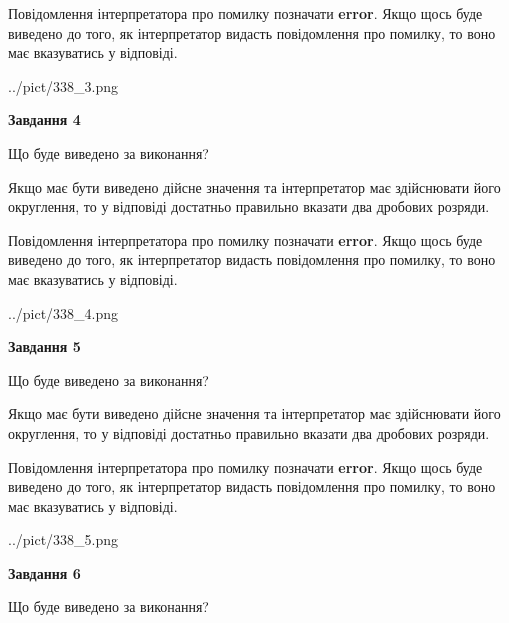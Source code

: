 \documentclass[12pt, ukrainian]{article}
\begin{document}
{\begin {Large}
Повідомлення інтерпретатора про помилку позначати \textbf{error}.
Якщо щось буде виведено до того, як інтерпретатор видасть повідомлення про помилку, 
то воно має вказуватись у відповіді. \par

\begin{center}
	{../pict/338_3.png}
\end{center}
\newpage

{\begin {center}\textbf{Завдання 4}\end {center}}\par
Що буде виведено за виконання? \par

Якщо має бути виведено дійсне значення та інтерпретатор має здійснювати його округлення, 
то у відповіді достатньо правильно вказати два дробових розряди.

Повідомлення інтерпретатора про помилку позначати \textbf{error}.
Якщо щось буде виведено до того, як інтерпретатор видасть повідомлення про помилку, 
то воно має вказуватись у відповіді. \par

\begin{center}
	{../pict/338_4.png}
\end{center}
\newpage

{\begin {center}\textbf{Завдання 5}\end {center}}\par
Що буде виведено за виконання? \par

Якщо має бути виведено дійсне значення та інтерпретатор має здійснювати його округлення, 
то у відповіді достатньо правильно вказати два дробових розряди.

Повідомлення інтерпретатора про помилку позначати \textbf{error}.
Якщо щось буде виведено до того, як інтерпретатор видасть повідомлення про помилку, 
то воно має вказуватись у відповіді. \par

\begin{center}
	{../pict/338_5.png}
\end{center}
\newpage

{\begin {center}\textbf{Завдання 6}\end {center}}\par
Що буде виведено за виконання? \par


\end{Large}}
\end{document}
